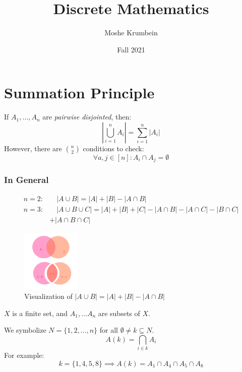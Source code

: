 \documentclass[00_complete]{subfiles}
\title{Discrete Mathematics}
\author{Moshe Krumbein}
\date{Fall 2021}
\begin{document}

\section{Summation Principle}

\begin{theorem}
    If $A_1,\dots,A_n$ are \emph{pairwise disjointed}, then:
    $$\left|\bigcup_{i=1}^nA_i\right| = \sum_{i=1}^{n}|A_i|$$
    However, there are $\binom{n}{2}$ conditions to check:
    $$\forall a,j \in [n]: A_i \cap A_j = \emptyset$$
\end{theorem}

\subsubsection{In General}

\begin{align*}
    n=2:& \quad|A \cup B| = |A| + |B| - |A \cap B| \\
    n=3:& \quad|A \cup B \cup C| = |A| + |B| + |C| - |A \cap B| - |A \cap C| - |B \cap
C| \\&+ |A \cap B \cap C|
\end{align*}

\begin{figure}[ht]
  \centering
    \includegraphics[width=0.25\textwidth]{w7_venn1}
    \caption{Visualization of $|A \cup B| = |A| + |B| - |A \cap B|$}
\end{figure}

\begin{symbols}
    $X$ is a finite set, and $A_1,\dots A_n$ are subsets of $X$.

    We symbolize $N=\{1,2,\dots,n\}$ for all $\emptyset \neq k \subseteq N$.
    $$A(k) = \bigcap_{i \in k}A_i$$
    For example:
    $$k = \{1,4,5,8\} \implies A(k) = A_1 \cap A_4 \cap A_5 \cap A_8$$
\end{symbols}
\end{document}
